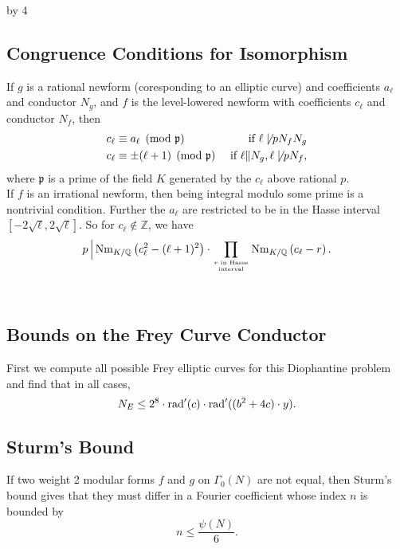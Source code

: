 \documentclass[12pt]{scrartcl}
\def\Q{{\mathbb Q}}
\def\Z{{\mathbb Z}}
\newcommand{\rad}{{\rm{rad}}}
\newcommand{\p}{\mathfrak{p}}
\newcommand{\Nm}{\operatorname{Nm}}
\def\anzspalten{4}
\newlength{\kastenwidth}
\newenvironment{kasten}{%
  \begin{lrbox}{\dummybox}%
    \begin{minipage}{0.96\linewidth}}%
    {\end{minipage}%
  \end{lrbox}%
  \raisebox{-\depth}{\psshadowbox[framesep=1em]{\usebox{\dummybox}}}\\[0.5em]}
\newenvironment{spalte}{%
  \setlength\kastenwidth{1.2\textwidth}
  \divide\kastenwidth by \anzspalten
  \begin{minipage}[t]{\kastenwidth}}{\end{minipage}\hfill}
\begin{document}
\begin{lrbox}{\spalten}
{\begin{spalte}
\begin{kasten}

\subsection*{ \color{blue} Congruence Conditions for Isomorphism}

If $g$ is a rational newform (coresponding to an elliptic curve) and coefficients $a_\ell$ and conductor $N_g$, and $f$ is the level-lowered newform with coefficients $c_\ell$ and conductor $N_f$, then
\begin{align*}
c_\ell &\equiv a_\ell \pmod{\p} & \text{ if $\ell \not\mid pN_fN_g$} \\
c_\ell &\equiv \pm(\ell+1) \pmod{\p} & \text{ if $\ell \| N_g, \ell \not\mid pN_f$},
\end{align*}
where $\p$ is a prime of the field $K$ generated by the $c_\ell$ above rational $p$. \\

If $f$ is an irrational newform, then being integral modulo some prime is a nontrivial condition.  Further the $a_\ell$ are restricted to be in the Hasse interval $[-2\sqrt{\ell}, 2\sqrt{\ell}]$.  So for $c_\ell \not\in \Z$, we have
\[ p\, \Big| \Nm_{K/\Q}\left(c_\ell^2 - (\ell+1)^2\right) \cdot \prod_{r \text{ in Hasse} \atop \text{interval}} \Nm_{K/\Q} \left( c_\ell - r \right). \]


\end{kasten}

\begin{kasten}

\subsection*{\color{blue} Bounds on the Frey Curve Conductor}

First we compute all possible Frey elliptic curves for this Diophantine problem and find that in all cases,
\[N_E \leq 2^8 \cdot \rad'(c) \cdot \rad'((b^2+4c)\cdot y).\]


\subsection*{\color{blue} Sturm's Bound}

If two weight 2 modular forms $f$ and $g$ on $\Gamma_0(N)$ are not equal, then Sturm's bound gives that they must differ in a Fourier coefficient whose index $n$ is bounded by 
\[n \leq \frac{\psi(N)}{6}.\] 


\end{kasten}
\end{spalte}}
\end{lrbox}
\end{document}
